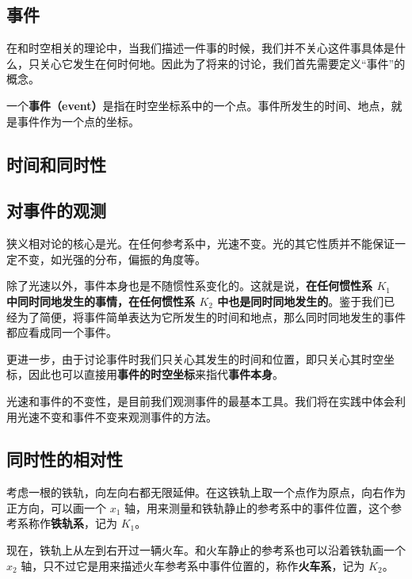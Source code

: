 

\subsection{事件}

在和时空相关的理论中，当我们描述一件事的时候，我们并不关心这件事具体是什么，只关心它发生在何时何地。因此为了将来的讨论，我们首先需要定义“事件”的概念。

一个\textbf{事件（event）}是指在时空坐标系中的一个点。事件所发生的时间、地点，就是事件作为一个点的坐标。

\subsection{时间和同时性}

\subsection{对事件的观测}

狭义相对论的核心是光。在任何参考系中，光速不变。光的其它性质并不能保证一定不变，如光强的分布，偏振的角度等。

除了光速以外，事件本身也是不随惯性系变化的。这就是说，\textbf{在任何惯性系 $K_1$ 中同时同地发生的事情，在任何惯性系 $K_2$ 中也是同时同地发生的}。鉴于我们已经为了简便，将事件简单表达为它所发生的时间和地点，那么同时同地发生的事件都应看成同一个事件。

更进一步，由于讨论事件时我们只关心其发生的时间和位置，即只关心其时空坐标，因此也可以直接用\textbf{事件的时空坐标}来指代\textbf{事件本身}。

光速和事件的不变性，是目前我们观测事件的最基本工具。我们将在实践中体会利用光速不变和事件不变来观测事件的方法。

\subsection{同时性的相对性}

考虑一根的铁轨，向左向右都无限延伸。在这铁轨上取一个点作为原点，向右作为正方向，可以画一个 $x_1$ 轴，用来测量和铁轨静止的参考系中的事件位置，这个参考系称作\textbf{铁轨系}，记为 $K_1$。

现在，铁轨上从左到右开过一辆火车。和火车静止的参考系也可以沿着铁轨画一个 $x_2$ 轴，只不过它是用来描述火车参考系中事件位置的，称作\textbf{火车系}，记为 $K_2$。


